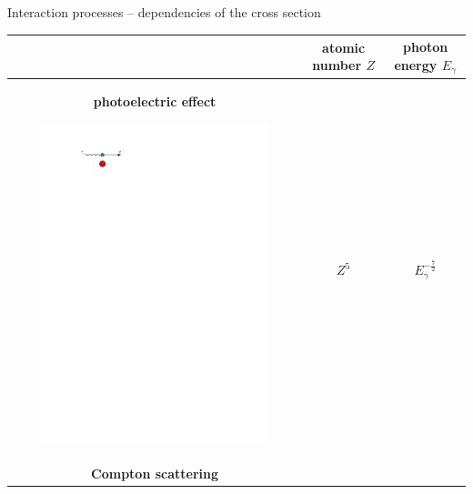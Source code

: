 \documentclass[11pt,xcolor=dvipsnames,professionalfonts]{beamer}
\begin{document}
\begin{frame}{Interaction processes -- dependencies of the cross section}
	\begin{center}
		\begin{tabular}{ccc}
			\toprule
			& atomic number $Z$ & photon energy $E_\gamma$\\
			\midrule
			\begin{minipage}{0.3\textwidth}
				\centering
				\textbf{photoelectric effect}
				
				\vspace{0.1cm}
				
				\includegraphics[width=0.8\textwidth]{./figures/photoeffect_intro.pdf} 
				
				\vspace{0.4cm}
			\end{minipage} & $Z^5$ & $E_\gamma^{-\frac{7}{2}}$ \\
			
			\begin{minipage}{0.3\textwidth}
				\centering
				\textbf{Compton scattering}
				
				\vspace{0.1cm}
				

\end{minipage}
\end{tabular}
\end{center}
\end{frame}
\end{document}

